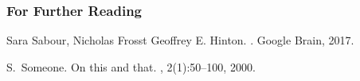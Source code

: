 \documentclass{beamer}
\begin{document}
\begin{frame}[allowframebreaks]
  \frametitle<presentation>{For Further Reading}
    
  \begin{thebibliography}{10}
    
  \beamertemplatebookbibitems

    Sara Sabour, Nicholas Frosst
Geoffrey E. Hinton.
    .
    \newblock Google Brain, 2017.
 
    
  \beamertemplatearticlebibitems

    S.~Someone.
    \newblock On this and that.
    , 2(1):50--100,
    2000.
  \end{thebibliography}
\end{frame}
\end{document}
